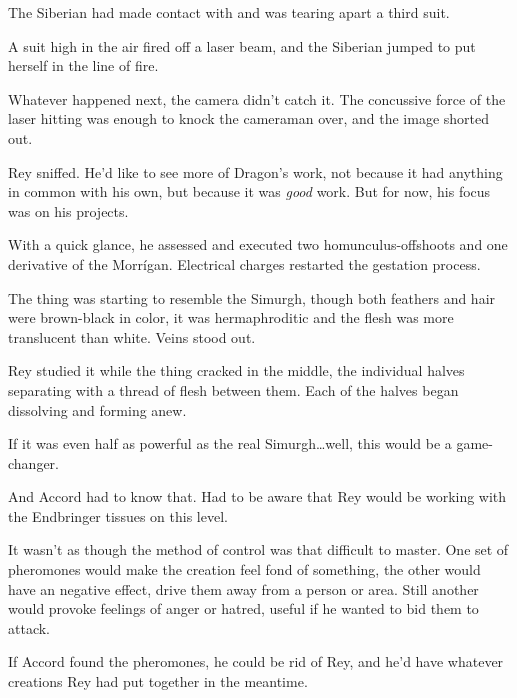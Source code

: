 The Siberian had made contact with and was tearing apart a third suit.



A suit high in the air fired off a laser beam, and the Siberian jumped to put herself in the line of fire.



Whatever happened next, the camera didn't catch it.  The concussive force of the laser hitting was enough to knock the cameraman over, and the image shorted out.



Rey sniffed.  He'd like to see more of Dragon's work, not because it had anything in common with his own, but because it was \emph{good} work.  But for now, his focus was on his projects.



With a quick glance, he assessed and executed two homunculus-offshoots and one derivative of the Morr\'{i}gan.  Electrical charges restarted the gestation process.



The thing was starting to resemble the Simurgh, though both feathers and hair were brown-black in color, it was hermaphroditic and the flesh was more translucent than white.  Veins stood out.



Rey studied it while the thing cracked in the middle, the individual halves separating with a thread of flesh between them.  Each of the halves began dissolving and forming anew.



If it was even half as powerful as the real Simurgh\ldots well, this would be a game-changer.



And Accord had to know that.  Had to be aware that Rey would be working with the Endbringer tissues on this level.



It wasn't as though the method of control was that difficult to master.  One set of pheromones would make the creation feel fond of something, the other would have an negative effect, drive them away from a person or area.  Still another would provoke feelings of anger or hatred, useful if he wanted to bid them to attack.



If Accord found the pheromones, he could be rid of Rey, and he'd have whatever creations Rey had put together in the meantime.



